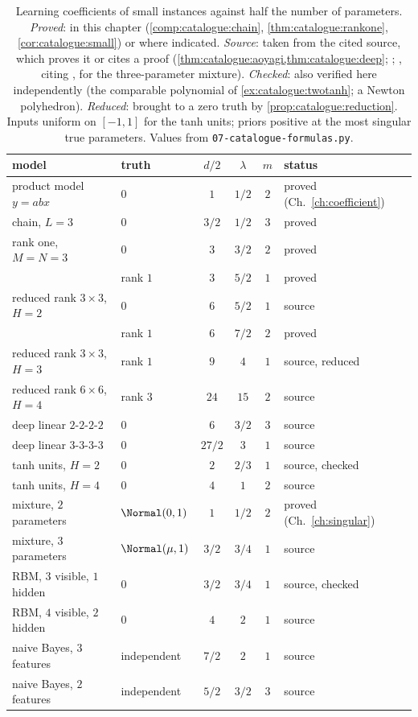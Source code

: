 \begin{refsection}
\begin{table}[t]
\centering\footnotesize
\begin{tabular}{@{}llcccl@{}}
\toprule
model & truth & $d/2$ & $\lambda$ & $m$ & status\\
\midrule
product model $y=abx$ & $0$ & $1$ & $1/2$ & $2$ & proved (Ch.~\ref{ch:coefficient})\\
chain, $L=3$ & $0$ & $3/2$ & $1/2$ & $3$ & proved\\
rank one, $M=N=3$ & $0$ & $3$ & $3/2$ & $2$ & proved\\
 & rank $1$ & $3$ & $5/2$ & $1$ & proved\\
reduced rank $3\times3$, $H=2$ & $0$ & $6$ & $5/2$ & $1$ & source\\
 & rank $1$ & $6$ & $7/2$ & $2$ & proved\\
reduced rank $3\times3$, $H=3$ & rank $1$ & $9$ & $4$ & $1$ & source, reduced\\
reduced rank $6\times6$, $H=4$ & rank $3$ & $24$ & $15$ & $2$ & source\\
deep linear $2$-$2$-$2$-$2$ & $0$ & $6$ & $3/2$ & $3$ & source\\
deep linear $3$-$3$-$3$-$3$ & $0$ & $27/2$ & $3$ & $1$ & source\\
tanh units, $H=2$ & $0$ & $2$ & $2/3$ & $1$ & source, checked\\
tanh units, $H=4$ & $0$ & $4$ & $1$ & $2$ & source\\
mixture, $2$ parameters & $\Normal(0,1)$ & $1$ & $1/2$ & $2$ & proved (Ch.~\ref{ch:singular})\\
mixture, $3$ parameters & $\Normal(\mu,1)$ & $3/2$ & $3/4$ & $1$ & source\\
RBM, $3$ visible, $1$ hidden & $0$ & $3/2$ & $3/4$ & $1$ & source, checked\\
RBM, $4$ visible, $2$ hidden & $0$ & $4$ & $2$ & $1$ & source\\
naive Bayes, $3$ features & independent & $7/2$ & $2$ & $1$ & source\\
naive Bayes, $2$ features & independent & $5/2$ & $3/2$ & $3$ & source\\
\bottomrule
\end{tabular}
\caption{Learning coefficients of small instances against half the number of parameters. \emph{Proved}: in this chapter (\cref{comp:catalogue:chain}, \cref{thm:catalogue:rankone}, \cref{cor:catalogue:small}) or where indicated. \emph{Source}: taken from the cited source, which proves it or cites a proof (\cref{thm:catalogue:aoyagi,thm:catalogue:deep}; \textcite{Aoyagi2019,Aoyagi2010b,RusakovGeiger2005}; \textcite{DrtonPlummer2017}, citing \textcite{Aoyagi2010a}, for the three-parameter mixture). \emph{Checked}: also verified here independently (the comparable polynomial of \cref{ex:catalogue:twotanh}; a Newton polyhedron). \emph{Reduced}: brought to a zero truth by \cref{prop:catalogue:reduction}. Inputs uniform on $[-1,1]$ for the tanh units; priors positive at the most singular true parameters. Values from \texttt{07-catalogue-formulas.py}.}\label{tab:catalogue:small}
\end{table}


\end{refsection}
